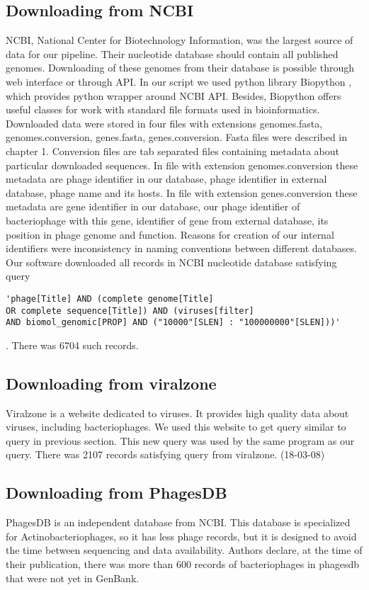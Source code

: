 \subsection{Downloading from NCBI}
NCBI, National Center for Biotechnology Information, was the largest source of data for our pipeline.
Their nucleotide database should contain all published genomes.
Downloading of these genomes from their database is possible through web interface or through API.
In our script we used python library Biopython \cite{biopython}, which provides python wrapper around NCBI API.
Besides, Biopython offers useful classes for work with standard file formats used in bioinformatics.
Downloaded data were stored in four files with extensions genomes.fasta, genomes.conversion, genes.fasta, genes.conversion.
Fasta files were described in chapter 1.
Conversion files are tab separated files containing metadata about particular downloaded sequences.
In file with extension genomes.conversion these metadata are phage identifier in our database, phage identifier in external database, phage name and its hosts.
In file with extension genes.conversion these metadata are gene identifier in our database, our phage identifier of bacteriophage with this gene, identifier of gene from external database, its position in phage genome and function.
Reasons for creation of our internal identifiers were inconsistency in naming conventions between different databases.
Our software downloaded all records in NCBI nucleotide database satisfying query 
\begin{verbatim}
'phage[Title] AND (complete genome[Title] 
OR complete sequence[Title]) AND (viruses[filter] 
AND biomol_genomic[PROP] AND ("10000"[SLEN] : "100000000"[SLEN]))'
\end{verbatim}. There was 6704 such records. 

\subsection{Downloading from viralzone}
Viralzone is a website dedicated to viruses. 
It provides high quality data about viruses, including bacteriophages.
We used this website to get query similar to query in previous section.
This new query was used by the same program as our query.
There was 2107 records satisfying query from viralzone. (18-03-08)

\subsection{Downloading from PhagesDB}
PhagesDB is an independent database from NCBI. 
This database is specialized for Actinobacteriophages, so it has less phage records, but it is designed to avoid the time between sequencing and data availability.
Authors declare, at the time of their publication, there was more than 600 records of bacteriophages in phagesdb that were not yet in GenBank.


